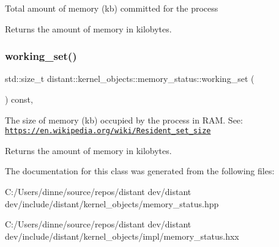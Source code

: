 Total amount of memory (kb) committed for the process \begin{DoxyReturn}{Returns}
the amount of memory in kilobytes. 
\end{DoxyReturn}
\mbox{\label{classdistant_1_1kernel__objects_1_1memory__status_a14532979665699d3818cc7319ba95b32}} 
\subsubsection{\texorpdfstring{working\+\_\+set()}{working\_set()}}
{\footnotesize\ttfamily std\+::size\+\_\+t distant\+::kernel\+\_\+objects\+::memory\+\_\+status\+::working\+\_\+set (\begin{DoxyParamCaption}{ }\end{DoxyParamCaption}) const\hspace{0.3cm}{\ttfamily [inline]}, {\ttfamily [noexcept]}}

The size of memory (kb) occupied by the process in R\+AM. See\+: \href{https://en.wikipedia.org/wiki/Resident_set_size}{\tt https\+://en.\+wikipedia.\+org/wiki/\+Resident\+\_\+set\+\_\+size} \begin{DoxyReturn}{Returns}
the amount of memory in kilobytes. 
\end{DoxyReturn}


The documentation for this class was generated from the following files\+:\begin{DoxyCompactItemize}
\item 
C\+:/\+Users/dinne/source/repos/distant dev/distant dev/include/distant/kernel\+\_\+objects/memory\+\_\+status.\+hpp\item 
C\+:/\+Users/dinne/source/repos/distant dev/distant dev/include/distant/kernel\+\_\+objects/impl/memory\+\_\+status.\+hxx\end{DoxyCompactItemize}
